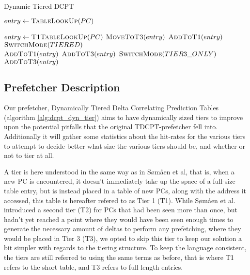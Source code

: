 \begin{algorithm}
\footnotesize
\caption{Dynamic Tiered DCPT}
  \begin{algorithmic}[1]
      \State $entry \gets \Call{TableLookUp}{PC}$

          \State $entry \gets \Call{T1TableLookUp}{PC}$
            \State $\Call{MoveToT3}{entry}$
          \Else
	    \State $\Call{AddToT1}{entry}$ 
          \EndIf
        \Else
            \State $\Call{SwitchMode}{TIERED}$ \\
	    \State $\Call{AddToT1}{entry}$
          \Else
	    \State $\Call{AddToT3}{entry}$
          \EndIf
        \EndIf
	  \State $\Call{SwitchMode}{TIER3\_ONLY}$
	\EndIf
	\State $\Call{AddToT3}{entry}$
      \EndIf
    \EndProcedure
  \end{algorithmic}
  \label{alg:dcpt_dyn_tier}
\end{algorithm}


\subsection{Prefetcher Description}

Our prefetcher, Dynamically Tiered Delta Correlating Prediction
Tables (algorithm \ref{alg:dcpt_dyn_tier}) aims to have dynamically sized tiers to improve upon the potential
pitfalls that the original TDCPT-prefetcher fell into. Additionally it will
gather some statistics about the hit-rates for the various tiers to attempt to
decide better what size the various tiers should be, and whether or not to tier
at all.

A tier is here understood in the same way as in Sømåen et al, that is, when a
new PC is encountered, it doesn't immediately take up the space of a full-size
table entry, but is instead placed in a table of new PCs, along with the
address it accessed, this table is hereafter refered to as Tier 1 (T1). While
Sømåen et al. introduced a second tier (T2) for PCs that had been seen more
than once, but hadn't yet reached a point where they would have been seen
enough times to generate the necessary amount of deltas to perform any
prefetching, where they would be placed in Tier 3 (T3), we opted to skip this
tier to keep our solution a bit simpler with regards to the tiering structure.
To keep the language consistent, the tiers are still referred to using the
same terms as before, that is where T1 refers to the short table, and T3
refers to full length entries.

